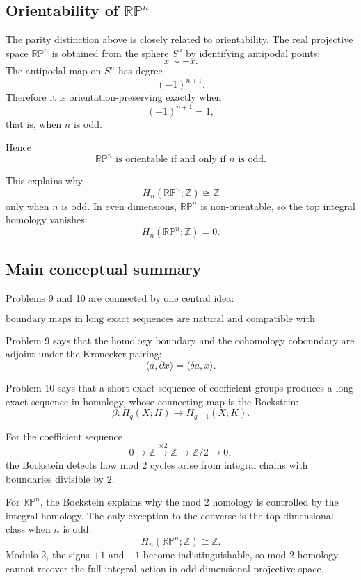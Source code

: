\documentclass[12pt,a4paper]{article}
\theoremstyle{notespace}
\begin{document}
\subsection{Orientability of \(\mathbb{RP}^n\)}

The parity distinction above is closely related to orientability. The real projective space \(\mathbb{RP}^n\) is obtained from the sphere \(S^n\) by identifying antipodal points:
\[
x\sim -x.
\]
The antipodal map on \(S^n\) has degree
\[
(-1)^{n+1}.
\]
Therefore it is orientation-preserving exactly when
\[
(-1)^{n+1}=1,
\]
that is, when \(n\) is odd.

Hence
\[
\boxed{
	\mathbb{RP}^n\text{ is orientable if and only if }n\text{ is odd}.
}
\]

This explains why
\[
H_n(\mathbb{RP}^n;\mathbb Z)\cong \mathbb Z
\]
only when \(n\) is odd. In even dimensions, \(\mathbb{RP}^n\) is non-orientable, so the top integral homology vanishes:
\[
H_n(\mathbb{RP}^n;\mathbb Z)=0.
\]

\subsection{Main conceptual summary}

Problems 9 and 10 are connected by one central idea:

\[
\boxed{
	\text{boundary maps in long exact sequences are natural and compatible with evaluation.}
}
\]

Problem 9 says that the homology boundary and the cohomology coboundary are adjoint under the Kronecker pairing:
\[
\boxed{
	\langle a,\partial x\rangle=\langle \delta a,x\rangle.
}
\]

Problem 10 says that a short exact sequence of coefficient groups produces a long exact sequence in homology, whose connecting map is the Bockstein:
\[
\boxed{
	\beta:H_q(X;H)\longrightarrow H_{q-1}(X;K).
}
\]

For the coefficient sequence
\[
0\to\mathbb Z\xrightarrow{\times 2}\mathbb Z\to\mathbb Z/2\to 0,
\]
the Bockstein detects how mod \(2\) cycles arise from integral chains with boundaries divisible by \(2\).

For \(\mathbb{RP}^n\), the Bockstein explains why the mod \(2\) homology is controlled by the integral homology. The only exception to the converse is the top-dimensional class when \(n\) is odd:
\[
H_n(\mathbb{RP}^n;\mathbb Z)\cong \mathbb Z.
\]
Modulo \(2\), the signs \(+1\) and \(-1\) become indistinguishable, so mod \(2\) homology cannot recover the full integral action in odd-dimensional projective space.
\end{document}
